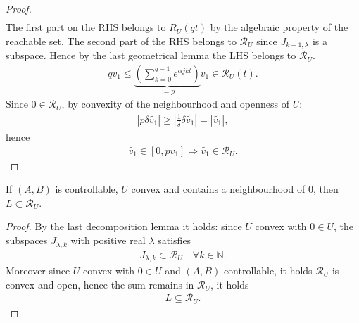 \begin{proof}
\begin{align*}
	\end{align*}
	The first part on the RHS belongs to $R_U(qt)$ by the algebraic property of the reachable set. The second part of the RHS belongs to $\mathcal{R}_U$ since $J_{k - 1, \lambda}$ is a subspace. Hence by the last geometrical lemma the LHS belongs to $\mathcal{R}_U$. 
	\begin{align*}
		q v_1 \le \underbrace{(\sum_{k = 0}^{ q - 1} e^{\alpha j kt})}_{:= p}v_1 \in \mathcal{R}_U(t). 
	\end{align*}
	Since $0 \in \mathcal{R}_U$, by convexity of the neighbourhood and openness of $U$:  
	\begin{align*}
		|p \delta \tilde{v_1}| \ge |\frac{1}{\delta} \delta \tilde{ v_1}| = |\tilde{v_1}|,
	\end{align*}
	hence
	\begin{align*}
		\tilde{v_1} \in [0, pv_1] \Rightarrow \tilde{v_1} \in \mathcal{R}_U. 
	\end{align*}
\end{proof}

\begin{corollary}
	If $(A, B)$ is controllable, $U$ convex and contains a neighbourhood of $0$, then $L \subset \mathcal{R}_U$. 
\end{corollary}
\begin{proof}
	By the last decomposition lemma it holds: since $U$ convex with $0 \in U$,  the subspaces $J_{\lambda, k}$ with positive real $\lambda$ satisfies
	\begin{align*}
		J_{\lambda, k} \subset \mathcal{R}_U \quad \forall k \in \mathbb{N}. 
	\end{align*}
	Moreover since $U$ convex with $0 \in U$ and $(A, B)$ controllable, it holds $\mathcal{R}_U$ is convex and open, hence the sum remains in $\mathcal{R}_U$, it holds
	\begin{align*}
		L \subseteq \mathcal{R}_U. 
	\end{align*}
\end{proof}



